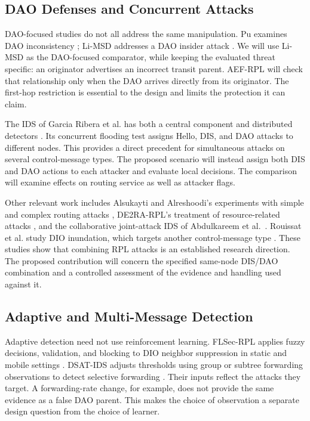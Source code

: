 \documentclass[journal]{IEEEtran}
\begin{document}
\subsection{DAO Defenses and Concurrent Attacks}
DAO-focused studies do not all address the same manipulation. Pu examines DAO inconsistency \cite{pu2018}; Li-MSD addresses a DAO insider attack \cite{limsd2024}. We will use Li-MSD as the DAO-focused comparator, while keeping the evaluated threat specific: an originator advertises an incorrect transit parent. AEF-RPL will check that relationship only when the DAO arrives directly from its originator. The first-hop restriction is essential to the design and limits the protection it can claim.

The IDS of Garcia Ribera et al. has both a central component and distributed detectors \cite{garciaribera2022}. Its concurrent flooding test assigns Hello, DIS, and DAO attacks to different nodes. This provides a direct precedent for simultaneous attacks on several control-message types. The proposed scenario will instead assign both DIS and DAO actions to each attacker and evaluate local decisions. The comparison will examine effects on routing service as well as attacker flags.

Other relevant work includes Alsukayti and Alreshoodi's experiments with simple and complex routing attacks \cite{alsukayti2023}, DE2RA-RPL's treatment of resource-related attacks \cite{de2rarpl2024}, and the collaborative joint-attack IDS of Abdulkareem et al.\ \cite{abdulkareem2024}. Rouissat et al. study DIO inundation, which targets another control-message type \cite{rouissat2023}. These studies show that combining RPL attacks is an established research direction. The proposed contribution will concern the specified same-node DIS/DAO combination and a controlled assessment of the evidence and handling used against it.

\subsection{Adaptive and Multi-Message Detection}
Adaptive detection need not use reinforcement learning. FLSec-RPL applies fuzzy decisions, validation, and blocking to DIO neighbor suppression in static and mobile settings \cite{flsecrpl2024}. DSAT-IDS adjusts thresholds using group or subtree forwarding observations to detect selective forwarding \cite{dsatids2024}. Their inputs reflect the attacks they target. A forwarding-rate change, for example, does not provide the same evidence as a false DAO parent. This makes the choice of observation a separate design question from the choice of learner.
\end{document}
